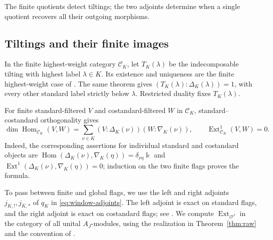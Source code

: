 \documentclass[11pt,reqno]{amsart}
\newcommand{\kk}{\Bbbk}\newcommand{\ZZ}{\mathbb Z}\newcommand{\NN}{\mathbb N}
\newcommand{\OO}{\mathcal O}\newcommand{\CC}{\mathscr C}\newcommand{\RR}{\mathcal R}\newcommand{\DD}{\mathcal D}
\newcommand{\Hom}{\operatorname{Hom}}\newcommand{\End}{\operatorname{End}}\newcommand{\Ext}{\operatorname{Ext}}
\theoremstyle{definition}
\theoremstyle{remark}
\numberwithin{equation}{section}
\begin{document}
The finite quotients detect tiltings; the two adjoints determine
when a single quotient recovers all their outgoing morphisms.

\subsection{Tiltings and their finite images}

In the finite highest-weight category $\CC_K$, let $T_K(\lambda)$ be the
indecomposable tilting with highest label $\lambda\in K$. Its existence
and uniqueness are the finite highest-weight case of
\cite[Theorem~4.2]{BS}. The same theorem gives
$(T_K(\lambda):\Delta_K(\lambda))=1$, with every other standard label
strictly below $\lambda$. Restricted duality fixes $T_K(\lambda)$.

For finite standard-filtered $V$ and costandard-filtered $W$ in
$\CC_K$, standard--costandard orthogonality gives
\begin{equation}\label{eq:finite-flag-hom}
 \dim\Hom_{\CC_K}(V,W)
   =\sum_{\nu\in K}(V:\Delta_K(\nu))(W:\nabla_K(\nu)),
 \qquad \Ext^1_{\CC_K}(V,W)=0.
\end{equation}
Indeed, the corresponding assertions for individual standard and
costandard objects are
$\Hom(\Delta_K(\nu),\nabla_K(\eta))=\delta_{\nu\eta}\kk$ and
$\Ext^1(\Delta_K(\nu),\nabla_K(\eta))=0$; induction on the two finite
flags proves the formula.

To pass between finite and global flags, we use the left and right
adjoints $j_{K,!},j_{K,*}$ of $q_K$ in
\eqref{eq:window-adjoints}. The left adjoint is exact on standard flags,
and the right adjoint is exact on costandard flags; see
\cite[Theorem~3.42(3)--(6)]{BS}. We compute $\Ext_{\OO^J}$ in the
category of all unital $A_J$-modules, using the realization in
Theorem~\ref{thm:raw} and the convention of \cite[Section~2.3]{BS}.
\end{document}

